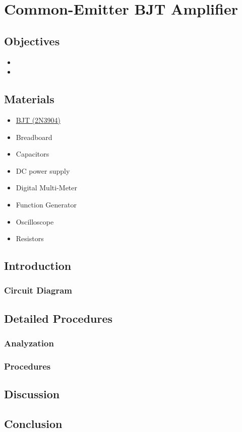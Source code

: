 \chapter{Common-Emitter BJT Amplifier}


\section{Objectives}
\begin{itemize}
    \item 
    \item 
\end{itemize}

\section{Materials}
\begin{itemize}
    \item \hyperref[2N3904_1]{BJT (2N3904)}
    \item Breadboard
    \item Capacitors
    \item DC power supply
    \item Digital Multi-Meter
    \item Function Generator
    \item Oscilloscope
    \item Resistors
\end{itemize}

\section{Introduction}
    \subsection{Circuit Diagram}


\section{Detailed Procedures}
    \subsection{Analyzation}


    \subsection{Procedures}

    
\section{Discussion}


\section{Conclusion}
